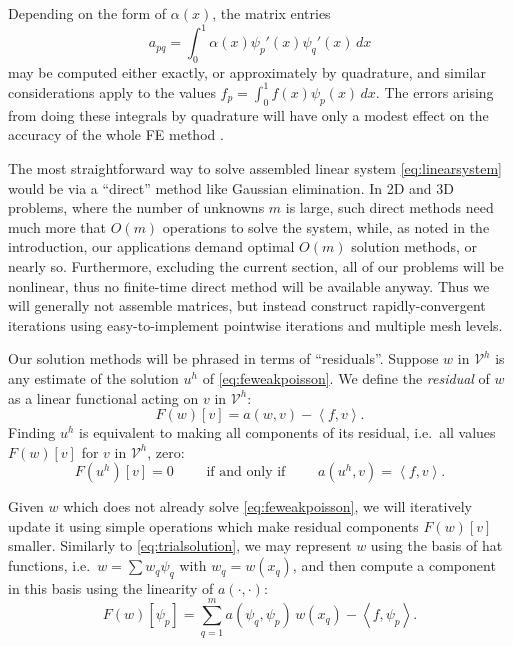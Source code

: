\documentclass[letterpaper,final,12pt,reqno]{amsart}
\theoremstyle{claim}
\newcommand{\ip}[2]{\left<#1,#2\right>}
\numberwithin{equation}{section}
\numberwithin{figure}{section}
\numberwithin{table}{section}
\numberwithin{theorem}{section}
\begin{document}
Depending on the form of $\alpha(x)$, the matrix entries
\begin{equation}
  a_{pq} = \int_0^1 \alpha(x) \psi_p'(x) \psi_q'(x)\,dx \label{eq:poissonentries}
\end{equation}
may be computed either exactly, or approximately by quadrature, and similar considerations apply to the values $f_p = \int_0^1 f(x) \psi_p(x)\,dx$.  The errors arising from doing these integrals by quadrature will have only a modest effect on the accuracy of the whole FE method \cite{Braess2007}.

The most straightforward way to solve assembled linear system \eqref{eq:linearsystem} would be via a ``direct'' method like Gaussian elimination.  In 2D and 3D problems, where the number of unknowns $m$ is large, such direct methods need much more that $O(m)$ operations to solve the system, while, as noted in the introduction, our applications demand optimal $O(m)$ solution methods, or nearly so.  Furthermore, excluding the current section, all of our problems will be nonlinear, thus no finite-time direct method will be available anyway.  Thus we will generally not assemble matrices, but instead construct rapidly-convergent iterations using easy-to-implement pointwise iterations and multiple mesh levels.

Our solution methods will be phrased in terms of ``residuals''.  Suppose $w$ in $\mathcal{V}^h$ is any estimate of the solution $u^h$ of \eqref{eq:feweakpoisson}.  We define the \emph{residual} of $w$ as a linear functional acting on $v$ in $\mathcal{V}^h$:
\begin{equation}
  F(w)[v] = a(w,v) - \ip{f}{v}.  \label{eq:residual}
\end{equation}
Finding $u^h$ is equivalent to making all components of its residual, i.e.~all values $F(w)[v]$ for $v$ in $\mathcal{V}^h$, zero:
\begin{equation}
  F(u^h)[v]=0 \qquad \text{ if and only if } \qquad a(u^h,v)=\ip{f}{v}. \label{eq:residualweakequivalence}
\end{equation}

Given $w$ which does not already solve \eqref{eq:feweakpoisson}, we will iteratively update it using simple operations which make residual components $F(w)[v]$ smaller.  Similarly to \eqref{eq:trialsolution}, we may represent $w$ using the basis of hat functions, i.e.~$w = \sum w_q \psi_q$ with $w_q = w(x_q)$, and then compute a component in this basis using the linearity of $a(\cdot,\cdot)$:
\begin{equation}
  F(w)[\psi_p] = \sum_{q=1}^{m} a(\psi_q,\psi_p) \,w(x_q) - \ip{f}{\psi_p}.  \label{eq:residualpoisson}
\end{equation}
\end{document}
